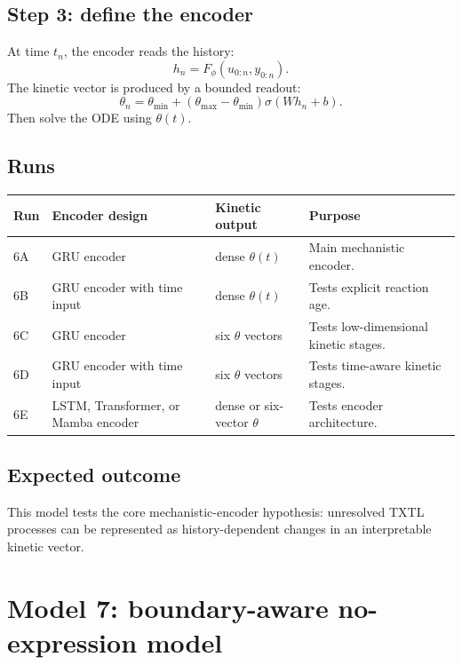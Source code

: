 \documentclass[11pt]{article}
\begin{document}
\subsection{Step 3: define the encoder}

At time $t_n$, the encoder reads the history:
\begin{equation}
    h_n=F_\phi(u_{0:n},y_{0:n}).
\end{equation}
The kinetic vector is produced by a bounded readout:
\begin{equation}
    \theta_n = \theta_{\min}+\left(\theta_{\max}-\theta_{\min}\right)\sigma(W h_n+b).
\end{equation}
Then solve the ODE using $\theta(t)$.

\subsection{Runs}

\begin{center}
\begin{tabularx}{\textwidth}{lllX}
\toprule
Run & Encoder design & Kinetic output & Purpose \\
\midrule
6A & GRU encoder & dense $\theta(t)$ & Main mechanistic encoder. \\
6B & GRU encoder with time input & dense $\theta(t)$ & Tests explicit reaction age. \\
6C & GRU encoder & six $\theta$ vectors & Tests low-dimensional kinetic stages. \\
6D & GRU encoder with time input & six $\theta$ vectors & Tests time-aware kinetic stages. \\
6E & LSTM, Transformer, or Mamba encoder & dense or six-vector $\theta$ & Tests encoder architecture. \\
\bottomrule
\end{tabularx}
\end{center}

\subsection{Expected outcome}

This model tests the core mechanistic-encoder hypothesis: unresolved TXTL processes can be represented as history-dependent changes in an interpretable kinetic vector.

\section{Model 7: boundary-aware no-expression model}
\end{document}
